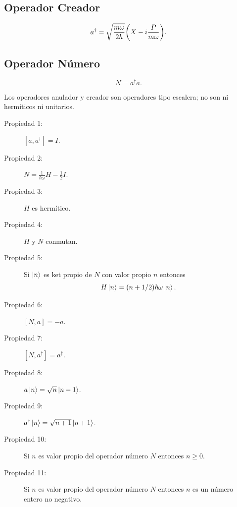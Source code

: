 \subsection{Operador Creador}
	$$ a^\dagger = \sqrt{\frac{m\omega}{2\hbar}} \qty(X - i\frac{P}{m\omega}). $$
	
\subsection{Operador Número}
	$$ N = a^\dagger a. $$
	
Los operadores anulador y creador son operadores tipo escalera; no son ni hermíticos ni unitarios.


\begin{description}
	\item[Propiedad 1: ] $[a,a^\dagger] = I$.
	\item[Propiedad 2: ] $N = \frac{1}{\hbar \omega} H - \frac{1}{2} I$.
	\item[Propiedad 3: ] $H$ es hermítico.
	\item[Propiedad 4: ] $H$ y $N$ conmutan.
	\item[Propiedad 5: ] Si $\ket{n}$ es ket propio de $N$ con valor propio $n$ entonces
		$$ H\ket{n} = \qty(n + 1/2) \hbar \omega \ket{n}. $$
	\item[Propiedad 6: ] $[N,a] = -a$.
	\item[Propiedad 7: ] $[N,a^\dagger] = a^\dagger$.
	\item[Propiedad 8: ] $a\ket{n} = \sqrt{n} \ket{n - 1}$.
	\item[Propiedad 9: ] $a^\dagger \ket{n} = \sqrt{n + 1} \ket{n + 1}$.
	\item[Propiedad 10: ] Si $n$ es valor propio del operador número $N$ entonces $n\geq 0$.
	\item[Propiedad 11: ] Si $n$ es valor propio del operador número $N$ entonces $n$ es un número entero no negativo. 
\end{description}




























